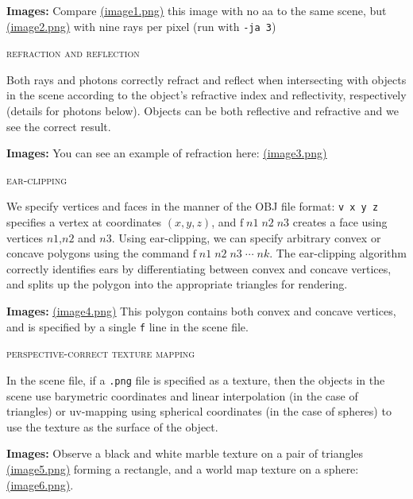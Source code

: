 \documentclass{article}
\begin{document}
\vspace{3mm}
{\bf Images:} Compare \href{run://images/image1.png}{\underline{(image1.png)}} this image with no aa  to the same scene, but \href{run://images/image2.png}{\underline{(image2.png)}} with nine rays per pixel (run with \verb+-ja 3+)


\begin{center}\textsc{refraction and reflection}\end{center} 
Both rays and photons correctly refract and reflect when intersecting with objects in the scene according to the object's refractive index and reflectivity, respectively (details for photons below). Objects can be both reflective and refractive and we see the correct result. 

\vspace{3mm}
{\bf Images:} You can see an example of refraction here: \href{run://images/image3.png}{\underline{(image3.png)}}


\begin{center}\textsc{ear-clipping}\end{center} 
We specify vertices and faces in the manner of the OBJ file format: \verb+v x y z+ specifies a vertex at coordinates $(x,y,z)$, and $\mathrm{f}\; n1 \; n2 \; n3$ creates a face using vertices $n1$,$n2$ and $n3$. Using ear-clipping, we can specify arbitrary convex or concave polygons using the command $\mathrm{f }\; n1 \; n2 \; n3 \; \cdots \; nk$. The ear-clipping algorithm correctly identifies ears by differentiating between convex and concave vertices, and splits up the polygon into the appropriate triangles for rendering.

\vspace{3mm}
{\bf Images:} \href{run://images/image4.png}{\underline{(image4.png)}} This polygon contains both convex and concave vertices, and is specified by a single \verb+f+ line in the scene file.

\begin{center}\textsc{perspective-correct texture mapping}\end{center} 
In the scene file, if a \verb+.png+ file is specified as a texture, then the objects in the scene use barymetric coordinates and linear interpolation (in the case of triangles) or uv-mapping using spherical coordinates (in the case of spheres) to use the texture as the surface of the object.

\vspace{3mm}
{\bf Images:} Observe a black and white marble texture on a pair of triangles \href{run://images/image5.png}{\underline{(image5.png)}} forming a rectangle, and a world map texture on a sphere: \href{run://images/image6.png}{\underline{(image6.png)}}.
\end{document}
